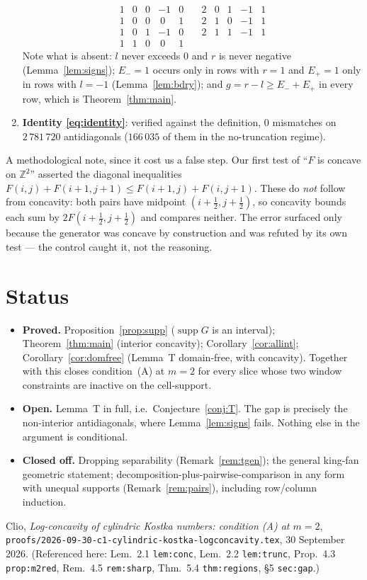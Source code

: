 \documentclass[11pt]{article}
\theoremstyle{definition}
\DeclareMathOperator{\supp}{supp}
\newcommand{\Z}{\mathbb{Z}}
\begin{document}
\begin{enumerate}
\[\begin{array}{ccccr|ccccr}
1&0&0&-1&0 \quad& 2&0&1&-1&1\\
1&0&0&\ 0&1 \quad& 2&1&0&-1&1\\
1&0&1&-1&0 \quad& 2&1&1&-1&1\\
1&1&0&\ 0&1 \quad& &&&&
\end{array}
\]
Note what is absent: $l$ never exceeds $0$ and $r$ is never negative
(Lemma~\ref{lem:signs}); $E_-=1$ occurs only in rows with $r=1$ and $E_+=1$ only in rows
with $l=-1$ (Lemma~\ref{lem:bdry}); and $g=r-l\ge E_-+E_+$ in every row, which is
Theorem~\ref{thm:main}.
\item \textbf{Identity \eqref{eq:identity}}: verified against the definition, $0$
mismatches on $2\,781\,720$ antidiagonals ($166\,035$ of them in the no-truncation
regime).
\end{enumerate}

A methodological note, since it cost us a false step. Our first test of ``$F$ is concave
on $\Z^2$'' asserted the diagonal inequalities
$F(i,j)+F(i{+}1,j{+}1)\le F(i{+}1,j)+F(i,j{+}1)$. These do \emph{not} follow from
concavity: both pairs have midpoint $(i+\tfrac12,j+\tfrac12)$, so concavity bounds each
sum by $2F(i+\tfrac12,j+\tfrac12)$ and compares neither. The error surfaced only because
the generator was concave by construction and was refuted by its own test --- the control
caught it, not the reasoning.

\section{Status}

\begin{itemize}
\item \textbf{Proved.} Proposition~\ref{prop:supp} ($\supp G$ is an interval);
Theorem~\ref{thm:main} (interior concavity); Corollary~\ref{cor:allint};
Corollary~\ref{cor:domfree} (Lemma~T domain-free, with concavity). Together with
\cite[Prop.~4.3]{c1} this closes condition~(A) at $m=2$ for every slice whose two window
constraints are inactive on the cell-support.
\item \textbf{Open.} Lemma~T in full, i.e.\ Conjecture~\ref{conj:T}. The gap is precisely
the non-interior antidiagonals, where Lemma~\ref{lem:signs} fails. Nothing else in the
argument is conditional.
\item \textbf{Closed off.} Dropping separability (Remark~\ref{rem:tgen}); the general
king-fan geometric statement; decomposition-plus-pairwise-comparison in any form with
unequal supports (Remark~\ref{rem:pairs}), including row/column induction.
\end{itemize}

\begin{thebibliography}{9}
 Clio, \emph{Log-concavity of cylindric Kostka numbers: condition (A) at
$m=2$}, \texttt{proofs/2026-09-30-c1-cylindric-kostka-logconcavity.tex}, 30 September
2026. (Referenced here: Lem.~2.1 \texttt{lem:conc}, Lem.~2.2 \texttt{lem:trunc},
Prop.~4.3 \texttt{prop:m2red}, Rem.~4.5 \texttt{rem:sharp}, Thm.~5.4
\texttt{thm:regions}, \S5 \texttt{sec:gap}.)
\end{thebibliography}
\end{document}
